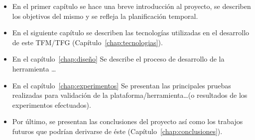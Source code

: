     \begin{itemize}
      \item En el primer capítulo se hace una breve introducción al proyecto, se describen los objetivos del mismo y se refleja la planificación temporal.
      \item En el siguiente capítulo se describen las tecnologías utilizadas en el desarrollo de este TFM/TFG (Capítulo~\ref{chap:tecnologias}).
      \item En el capítulo~\ref{chap:diseño} Se describe el proceso de desarrollo
      de la herramienta \ldots
      \item En el capítulo~\ref{chap:experimentos} Se presentan las principales pruebas realizadas
      para validación de la plataforma/herramienta\ldots (o resultados de los experimentos
      efectuados).
      \item Por último, se presentan las conclusiones del proyecto así como los trabajos futuros que podrían derivarse de éste (Capítulo~\ref{chap:conclusiones}).
    \end{itemize}

